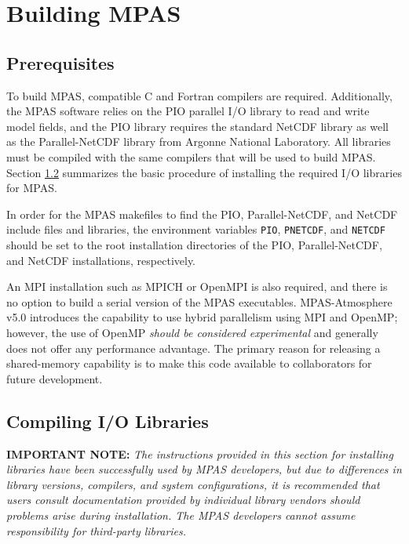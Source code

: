 \chapter{Building MPAS}
\label{chap:mpas_build_instructions}

\section{Prerequisites}
\label{build_prerequisites}

To build MPAS, compatible C and Fortran compilers are required. Additionally,
the MPAS software relies on the PIO parallel I/O library to read and write model
fields, and the PIO library requires the standard NetCDF library as well as the
Parallel-NetCDF library from Argonne National Laboratory. All libraries must be
compiled with the same compilers that will be used to build MPAS. Section
\ref{sec:build_io} summarizes the basic procedure of installing the required I/O
libraries for MPAS.

In order for the MPAS makefiles to find the PIO, Parallel-NetCDF, and NetCDF
include files and libraries, the environment variables {\tt PIO}, {\tt PNETCDF},
and {\tt NETCDF} should be set to the root installation directories of the PIO,
Parallel-NetCDF, and NetCDF installations, respectively. 

An MPI installation such as MPICH or OpenMPI is also required, and there is no
option to build a serial version of the MPAS executables. MPAS-Atmosphere v5.0
introduces the capability to use hybrid parallelism using MPI and OpenMP; however,
the use of OpenMP {\em should be considered experimental} and generally does not
offer any performance advantage. The primary reason for releasing a shared-memory
capability is to make this code available to collaborators for future development.


\section{Compiling I/O Libraries}
\label{sec:build_io}

{\bf IMPORTANT NOTE:} {\em The instructions provided in this section for
installing libraries have been successfully used by MPAS developers, but due to
differences in library versions, compilers, and system configurations, it is
recommended that users consult documentation provided by individual library
vendors should problems arise during installation. The MPAS developers cannot assume
responsibility for third-party libraries.} \vspace{12pt}

